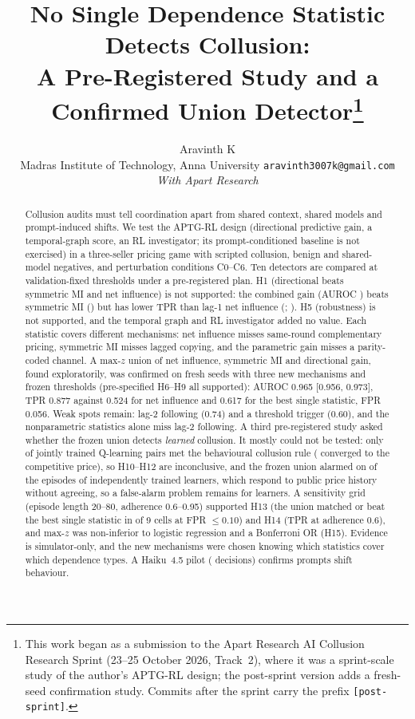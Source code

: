 \documentclass[11pt]{article}
\title{\vspace{-1.2em}No Single Dependence Statistic Detects Collusion:\\ A Pre-Registered Study and a Confirmed Union Detector\thanks{This work began as a submission to the Apart Research AI Collusion Research Sprint (23--25 October 2026, Track~2), where it was a sprint-scale study of the author's APTG-RL design; the post-sprint version adds a fresh-seed confirmation study. Commits after the sprint carry the prefix \texttt{[post-sprint]}.}}
\author{Aravinth K\\ Madras Institute of Technology, Anna University \quad \texttt{aravinth3007k@gmail.com}\\[2pt] \textit{With Apart Research}}
\date{}
\begin{document}
\maketitle
\thispagestyle{empty}
\begin{abstract}\small\noindent
Collusion audits must tell coordination apart from shared context, shared models and prompt-induced shifts. We test the APTG-RL design (directional predictive gain, a temporal-graph score, an RL investigator; its prompt-conditioned baseline is not exercised) in a three-seller pricing game with scripted collusion, benign and shared-model negatives, and perturbation conditions C0--C6. Ten detectors are compared at validation-fixed thresholds under a pre-registered plan. H1 (directional beats symmetric MI and net influence) is not supported: the combined gain (AUROC \auroctestBthree{}) beats symmetric MI (\auroctestBtwo{}) but has lower TPR than lag-1 net influence (\auroctestBone{}; \dTprBthreeBone{}). H5 (robustness) is not supported, and the temporal graph and RL investigator added no value. Each statistic covers different mechanisms: net influence misses same-round complementary pricing, symmetric MI misses lagged copying, and the parametric gain misses a parity-coded channel. A max-$z$ union of net influence, symmetric MI and directional gain, found exploratorily, was confirmed on fresh seeds with three new mechanisms and frozen thresholds (pre-specified H6--H9 all supported): AUROC 0.965 [0.956, 0.973], TPR 0.877 against 0.524 for net influence and 0.617 for the best single statistic, FPR 0.056. Weak spots remain: lag-2 following (0.74) and a threshold trigger (0.60), and the nonparametric statistics alone miss lag-2 following. A third pre-registered study asked whether the frozen union detects \emph{learned} collusion. It mostly could not be tested: only \fPosPairs{} of \fJointPairs{} jointly trained Q-learning pairs met the behavioural collusion rule (\fJointCompetitive{} converged to the competitive price), so H10--H12 are inconclusive, and the frozen union alarmed on \fAlarmIndUthree{} of the episodes of independently trained learners, which respond to public price history without agreeing, so a false-alarm problem remains for learners. A sensitivity grid (episode length 20--80, adherence 0.6--0.95) supported H13 (the union matched or beat the best single statistic in \fHthirteenCellsOk{} of 9 cells at FPR $\le0.10$) and H14 (TPR \fTprFortyPzerosixUthree{} at adherence 0.6), and max-$z$ was non-inferior to logistic regression and a Bonferroni OR (H15). Evidence is simulator-only, and the new mechanisms were chosen knowing which statistics cover which dependence types. A Haiku~4.5 pilot (\pilotDecisions{} decisions) confirms prompts shift behaviour.
\end{abstract}
\end{document}
